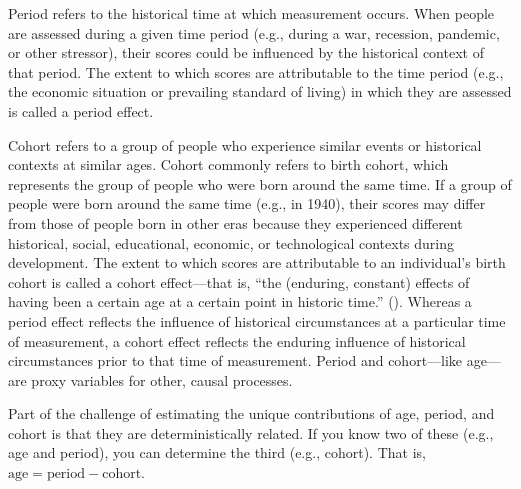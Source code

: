 \documentclass[
  american,
  letterpaper,
  12pt]{article}
\begin{document}
Period refers to the historical time at which measurement occurs. When
people are assessed during a given time period (e.g., during a war,
recession, pandemic, or other stressor), their scores could be
influenced by the historical context of that period. The extent to which
scores are attributable to the time period (e.g., the economic situation
or prevailing standard of living) in which they are assessed is called a
period effect.

Cohort refers to a group of people who experience similar events or
historical contexts at similar ages. Cohort commonly refers to birth
cohort, which represents the group of people who were born around the
same time. If a group of people were born around the same time (e.g., in
1940), their scores may differ from those of people born in other eras
because they experienced different historical, social, educational,
economic, or technological contexts during development. The extent to
which scores are attributable to an individual's birth cohort is called
a cohort effect---that is, ``the (enduring, constant) effects of having
been a certain age at a certain point in historic time.''
(). Whereas a period effect
reflects the influence of historical circumstances at a particular time
of measurement, a cohort effect reflects the enduring influence of
historical circumstances prior to that time of measurement. Period and
cohort---like age---are proxy variables for other, causal processes.

Part of the challenge of estimating the unique contributions of age,
period, and cohort is that they are deterministically related. If you
know two of these (e.g., age and period), you can determine the third
(e.g., cohort). That is, \(\text{age} = \text{period} - \text{cohort}\).
\end{document}
